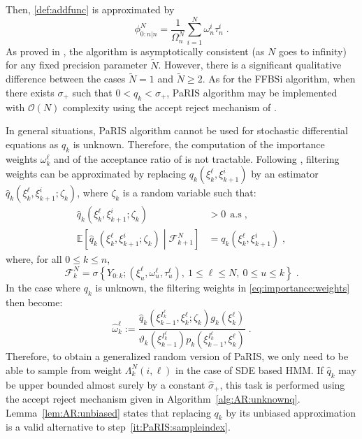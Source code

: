 \documentclass[12pt,draft]{article}
\newcommand{\eqsp}{\;}
\newcommand{\1}{\mathrm{1}}
\newcommand{\qk}{q_{k}}
\begin{document}
Then, \eqref{def:addfunc} is approximated by
\[
\phi_{0:n\vert n}^N = \frac{1}{\Omega_n^N}\sum_{i=1}^N \omega^{i}_n \tau_n^i\eqsp.
\] 
As proved in \cite{olsson:westerborn:2016}, the algorithm is asymptotically consistent (as $N$ goes to infinity) for any fixed precision parameter $\tilde N$. However, there is a significant qualitative difference between the cases $\tilde{N} = 1$ and $\tilde{N} \geq 2$. As for the FFBSi algorithm,  when there exists $\sigma_+$ such that $0<\qk <\sigma_+$, PaRIS algorithm may be implemented with $\mathcal{O}(N)$ complexity using the accept reject mechanism of \cite{douc:garivier:moulines:olsson:2011}.

In general situations, PaRIS algorithm cannot be used for stochastic differential equations as $\qk$ is unknown. Therefore, the computation of the importance weights $\omega_{k}^{\ell}$ and of the acceptance ratio of \cite{douc:garivier:moulines:olsson:2011} is not tractable. Following \cite{fearnhead:papaspiliopoulos:roberts:2008,olsson:strojby:2011}, filtering weights can be approximated by replacing $\qk(\xi^{\ell}_{k},\xi_{k+1}^{i})$  by an  estimator $\widehat{q}_k(\xi^{\ell}_{k},\xi_{k+1}^{i};\zeta_k)$, where $\zeta_k$ is a random variable such that:
\begin{align*}
\widehat{q}_k(\xi^{\ell}_{k},\xi_{k+1}^{i};\zeta_k)&> 0~~\text{a.s}\eqsp,\\
\mathbb{E}\left[\widehat{q}_k(\xi^{\ell}_{k},\xi_{k+1}^{i};\zeta_k)\middle| \mathcal{F}_{k+1}^N\right] &= \qk(\xi^{\ell}_{k},\xi_{k+1}^{i})\eqsp,
\end{align*}
where, for all $0\le k \le n$, 
\[
\mathcal{F}_{k}^N = \sigma\left\{Y_{0:k};(\xi^{\ell}_{u},\omega^{\ell}_{u},\tau^{\ell}_{u}),~1\le \ell\le N,~0\le u\le k\right\}\eqsp.
\]
In the case where $\qk$ is unknown, the filtering weights in \eqref{eq:importance:weights} then become:
\begin{equation}
\label{eq:random:weight}
\widehat{\omega}^{\ell}_k := \frac{\widehat{q}_k(\xi_{k-1}^{I^{\ell}_k},\xi^{\ell}_k;\zeta_k)g_k(\xi^{\ell}_k)}{\vartheta_k(\xi^{I^{\ell}_k}_{k-1}) p_k (\xi_{k-1}^{I^{\ell}_k},\xi^{\ell}_k)}\eqsp.
\end{equation}
Therefore, to obtain a generalized random version of PaRIS, we only need to be able to sample from weight $\Lambda_k^N(i,\ell)$ in the case of SDE based HMM. If $\widehat{q}_k$ may be upper bounded almost surely by a constant $\hat{\sigma}_+$, this task is performed using the accept reject mechanism given in Algorithm~\ref{alg:AR:unknownq}. Lemma~\ref{lem:AR:unbiased} states that replacing  $\qk$ by its unbiased approximation is a valid alternative to step~\eqref{it:PaRIS:sampleindex}.\\
\end{document}
